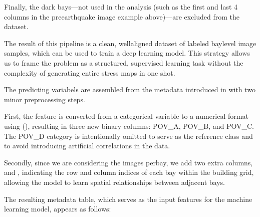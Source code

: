\documentclass[letterpaper,10pt,english]{sphinxmanual}
\begin{document}
\sphinxAtStartPar
Finally, the dark bays—not used in the analysis (such as the first and last 4
columns in the pre\sphinxhyphen{}earthquake image example above)—are excluded from the dataset.

\sphinxAtStartPar
\textendash{}

\sphinxAtStartPar
The result of this pipeline is a clean, well\sphinxhyphen{}aligned dataset of labeled
bay\sphinxhyphen{}level image samples, which can be used to train a deep learning model.
This strategy allows us to frame the problem as a structured, supervised
learning task without the complexity of generating entire stress maps in one
shot.

\sphinxAtStartPar
The predicting variabels are assembled from the metadata introduced in
{\hyperref[\detokenize{data:metadata}]{}} with two minor preprocessing steps.

\sphinxAtStartPar
First, the  feature is converted from a categorical variable to a
numerical format using  (), resulting in three new
binary columns: POV\_A, POV\_B, and POV\_C.
The POV\_D category is intentionally omitted to serve as the reference class
and to avoid introducing artificial correlations in the data.

\sphinxAtStartPar
Secondly, since we are considering the images per\sphinxhyphen{}bay, we add two extra columns,
 and , indicating the row and column indices of each bay within the
building grid, allowing the model to learn spatial relationships between
adjacent bays.

\sphinxAtStartPar
The resulting metadata table, which serves as the input features for the
machine learning model, appears as follows:
\end{document}
